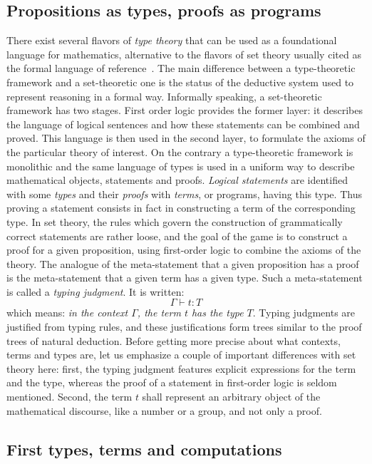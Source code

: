 \subsection{Propositions as types, proofs as programs}
There exist several flavors of \emph{type theory} that can be used
as a foundational language for mathematics, alternative to the
flavors of set theory usually cited as the formal language of
reference~\cite{bourbaki-sets}.
The main difference between a type-theoretic framework and
a set-theoretic one is the status of the deductive system used to
represent reasoning in a formal way. Informally speaking, a
set-theoretic framework has two stages. First order logic provides
the former layer: it describes the language of logical sentences and how
these statements can be combined and proved. This language is then
used in the second layer, to formulate the axioms of the particular
theory of interest.
On the contrary a type-theoretic framework is monolithic and the
same language of types is used in a uniform way to describe
mathematical objects, statements and proofs. \emph{Logical statements}
are identified with some \emph{types} and their \emph{proofs} with
\emph{terms}, or programs, having this type. Thus proving a statement
consists in fact in constructing a term of the corresponding type. In
set theory, the rules which govern the construction of
grammatically correct statements are rather loose, and the goal of the
game is to construct a proof for a given proposition, using
first-order logic to combine the axioms of the theory.
The analogue of the meta-statement that a given
proposition has a proof is the meta-statement that a given term has a
given type. Such a meta-statement is called a \emph{typing
  judgment}. It is written:
$$\Gamma \vdash t : T$$
which means:
\emph{in the context $\Gamma$, the term $t$ has the type $T$}.
Typing judgments are justified from typing rules, and these
justifications form trees similar to the proof trees of natural deduction.
Before getting more precise about what contexts, terms and types are,
let us emphasize a couple of important differences with set theory
here: first, the typing judgment features explicit expressions for
the term and the type, whereas the proof of a statement in first-order
logic is seldom mentioned. Second, the term $t$ shall represent an
arbitrary object of the mathematical discourse, like a number or a
group, and not only a proof.


\subsection{First types, terms and computations}\label{ssec:terms}

